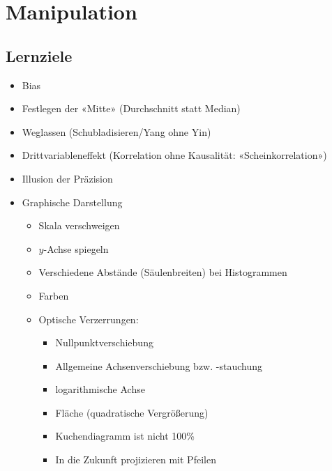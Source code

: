 
\section{Manipulation}

\subsection*{Lernziele}

\begin{itemize}
\item Bias%
\item Festlegen der «Mitte» (Durchschnitt statt Median)%
\item Weglassen (Schubladisieren/Yang ohne Yin)
\item Drittvariableneffekt (Korrelation ohne Kausalität: «Scheinkorrelation»)
\item Illusion der Präzision
\item Graphische Darstellung %
  \begin{itemize}
  \item Skala verschweigen
  \item $y$-Achse spiegeln
  \item Verschiedene Abstände (Säulenbreiten) bei Histogrammen
  \item Farben
  \item Optische Verzerrungen:
    \begin{itemize}
    \item Nullpunktverschiebung
    \item Allgemeine Achsenverschiebung bzw. -stauchung
    \item logarithmische Achse
    \item Fläche (quadratische Vergrößerung)
    \item Kuchendiagramm ist nicht 100\%
    \item In die Zukunft projizieren mit Pfeilen
    \end{itemize}
  \end{itemize}
\end{itemize}

